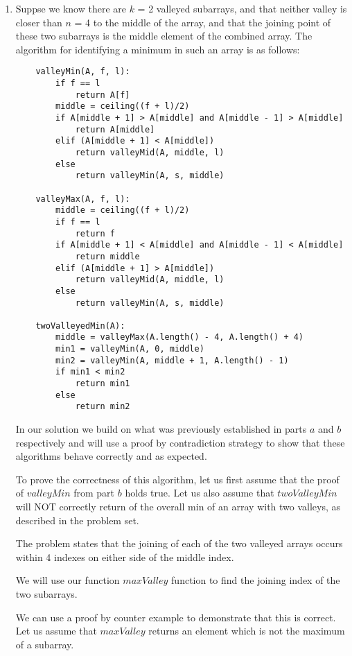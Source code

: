 \documentclass[12pt]{article}
\begin{document}
\begin{enumerate}
\begin{enumerate}
    \newpage
    \item
    Suppse we know there are $k$ = 2 valleyed subarrays, and that neither valley is closer than $n$ = 4 to the middle of the array, and that the joining point of these two subarrays is the middle element of the combined array. The algorithm for identifying a minimum in such an array is as follows:
     

    \begin{verbatim}
    valleyMin(A, f, l):
        if f == l
            return A[f]
        middle = ceiling((f + l)/2)
        if A[middle + 1] > A[middle] and A[middle - 1] > A[middle]
            return A[middle]
        elif (A[middle + 1] < A[middle])
            return valleyMid(A, middle, l)
        else
            return valleyMin(A, s, middle)
    
    valleyMax(A, f, l):
        middle = ceiling((f + l)/2)
        if f == l
            return f
        if A[middle + 1] < A[middle] and A[middle - 1] < A[middle]
            return middle
        elif (A[middle + 1] > A[middle])
            return valleyMid(A, middle, l)
        else
            return valleyMin(A, s, middle)
    
    twoValleyedMin(A):
        middle = valleyMax(A.length() - 4, A.length() + 4)
        min1 = valleyMin(A, 0, middle)
        min2 = valleyMin(A, middle + 1, A.length() - 1)
        if min1 < min2
            return min1
        else
            return min2
    \end{verbatim}
    
    In our solution we build on what was previously established in parts $a$ and $b$ respectively and will use a proof by contradiction strategy to show that these algorithms behave correctly and as expected. 
    
    To prove the correctness of this algorithm, let us first assume that the proof of $valleyMin$ from part $b$ holds true. Let us also assume that $twoValleyMin$ will NOT correctly return of the overall min of an array with two valleys, as described in the problem set.
    
    The problem states that the joining of each of the two valleyed arrays occurs within 4 indexes on either side of the middle index. 
    
    We will use our function $maxValley$ function to find the joining index of the two subarrays. 
    
    We can use a proof by counter example to demonstrate that this is correct. Let us assume that $maxValley$ returns an element which is not the maximum of a subarray.
    

\end{enumerate}
\end{enumerate}
\end{document}
